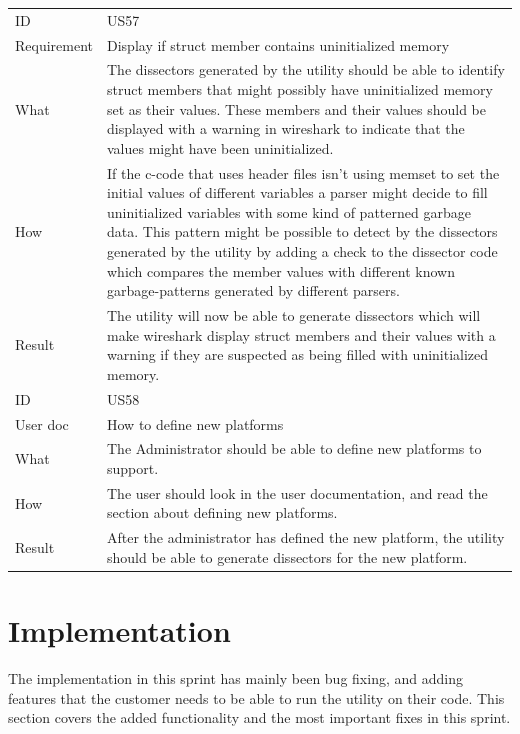 \begin{table}[htbp]
{\begin{tabularx}{1.2\textwidth}{l X}
	\midrule
	ID & US57 \\
	Requirement & Display if \gls{struct} \gls{member} contains uninitialized memory \\
	What & The \glspl{dissector} generated by the \gls{utility} should be able to identify \gls{struct} \glspl{member} that might possibly have uninitialized memory set as their values.
 	These \glspl{member} and their values should be displayed with a warning in \Gls{wireshark} to indicate that the values might have been uninitialized.  \\
	How & If the \Gls{c}-code that uses \gls{header} files isn’t using memset to set the initial values of different variables a \gls{parser} might decide to fill uninitialized variables with some kind of patterned garbage data.
 	This pattern might be possible to detect by the \glspl{dissector} generated by the \gls{utility} by adding a check to the \gls{dissector} code which compares the \gls{member} values with different known garbage-patterns generated by different \glspl{parser}. \\
	Result & The \gls{utility} will now be able to generate \glspl{dissector} which will make \Gls{wireshark} display \gls{struct} \glspl{member} and their values with a warning if they are suspected as being filled with uninitialized memory. \\	
	\midrule
	ID & US58 \\
	User doc & How to define new platforms \\
	What & The Administrator should be able to define new platforms to support.  \\
	How & The user should look in the user documentation, and read the section about defining new platforms. \\
	Result & After the administrator has defined the new platform, the \gls{utility} should be able to generate \glspl{dissector} for the new platform. \\	
	\bottomrule
\end{tabularx}}
\end{table}


\section{Implementation}
\label{sec:sp4impl}
The implementation in this sprint has mainly been bug fixing, and adding 
features that the customer needs to be able to run the \gls{utility} on their code. 
This section covers the added functionality and the most important fixes
in this sprint.

